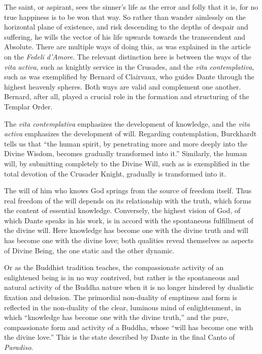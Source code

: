 The saint, or aspirant, sees the sinner's life as the error and folly that it is, for no true happiness is to be won that way. So rather than wander aimlessly on the horizontal plane of existence, and risk descending to the depths of despair and suffering, he wills the vector of his life upwards towards the transcendent and Absolute. There are multiple ways of doing this, as was explained in the article on the \emph{Fedeli d'Amore}. The relevant distinction here is between the ways of the \emph{vita activa}, such as knightly service in the Crusades, and the \emph{vita contemplativa}, such as was exemplified by Bernard of Clairvaux, who guides Dante through the highest heavenly spheres. Both ways are valid and complement one another. Bernard, after all, played a crucial role in the formation and structuring of the Templar Order.

The \emph{vita contemplativa} emphasizes the development of knowledge, and the \emph{vita activa} emphasizes the development of will. Regarding contemplation, Burckhardt tells us that ``the human spirit, by penetrating more and more deeply into the Divine Wisdom, becomes gradually transformed into it.'' Similarly, the human will, by submitting completely to the Divine Will, such as is exemplified in the total devotion of the Crusader Knight, gradually is transformed into it.

\begin{quotex} 
The will of him who knows God springs from the source of freedom itself. Thus real freedom of the will depends on its relationship with the truth, which forms the content of essential knowledge. Conversely, the highest vision of God, of which Dante speaks in his work, is in accord with the spontaneous fulfillment of the divine will. Here knowledge has become one with the divine truth and will has become one with the divine love; both qualities reveal themselves as aspects of Divine Being, the one static and the other dynamic.
\end{quotex}


Or as the Buddhist tradition teaches, the compassionate activity of an enlightened being is in no way contrived, but rather is the spontaneous and natural activity of the Buddha nature when it is no longer hindered by dualistic fixation and delusion. The primordial non-duality of emptiness and form is reflected in the non-duality of the clear, luminous mind of enlightenment, in which ``knowledge has become one with the divine truth,'' and the pure, compassionate form and activity of a Buddha, whose ``will has become one with the divine love.'' This is the state described by Dante in the final Canto of \emph{Paradiso}.

